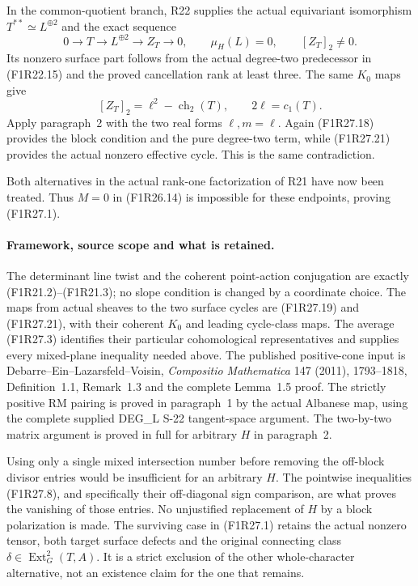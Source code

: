 In the common-quotient branch, R22 supplies
the actual equivariant isomorphism
$T^{**}\simeq L^{\oplus2}$ and the exact
sequence
\[
              0\longrightarrow T\longrightarrow
                    L^{\oplus2}\longrightarrow Z_T\longrightarrow0,
          \qquad \mu_H(L)=0,\qquad [Z_T]_2\ne0.
 \tag{F1R27.21}
\]
Its nonzero surface part follows from the
actual degree-two predecessor in (F1R22.15)
and the proved cancellation rank at least
three. The same $K_0$ maps give
\[
       [Z_T]_2=\ell^2-\operatorname{ch}_2(T),
                    \qquad 2\ell=c_1(T).
 \tag{F1R27.22}
\]
Apply paragraph~2 with the two real forms
$\ell,m=\ell$. Again (F1R27.18) provides
the block condition and the pure degree-two
term, while (F1R27.21) provides the actual
nonzero effective cycle. This is the same
contradiction.

Both alternatives in the actual rank-one
factorization of R21 have now been treated.
Thus $M=0$ in (F1R26.14) is impossible for
these endpoints, proving (F1R27.1).

\paragraph{Framework, source scope and what is retained.}
The determinant line twist and the coherent
point-action conjugation are exactly
(F1R21.2)--(F1R21.3); no slope condition is
changed by a coordinate choice. The maps
from actual sheaves to the two surface
cycles are (F1R27.19) and (F1R27.21),
with their coherent $K_0$ and leading
cycle-class maps. The average (F1R27.3)
identifies their particular cohomological
representatives and supplies every mixed-plane
inequality needed above.
The published positive-cone input is
Debarre--Ein--Lazarsfeld--Voisin,
\emph{Compositio Mathematica} 147 (2011),
1793--1818, Definition~1.1, Remark~1.3 and
the complete Lemma~1.5 proof.
The strictly positive RM pairing is proved
in paragraph~1 by the actual Albanese map,
using the complete supplied DEG\_L S-22
tangent-space argument.
The two-by-two matrix argument is proved
in full for arbitrary $H$ in paragraph~2.

Using only a single mixed intersection
number before removing the off-block
divisor entries would be insufficient
for an arbitrary $H$. The pointwise
inequalities (F1R27.8), and specifically
their off-diagonal sign comparison, are
what proves the vanishing of those entries.
No unjustified replacement of $H$ by a
block polarization is made.
The surviving case in (F1R27.1) retains
the actual nonzero tensor, both target
surface defects and the original connecting
class $\delta\in\operatorname{Ext}^2_G(T,A)$.
It is a strict exclusion of the other
whole-character alternative, not an
existence claim for the one that remains.
